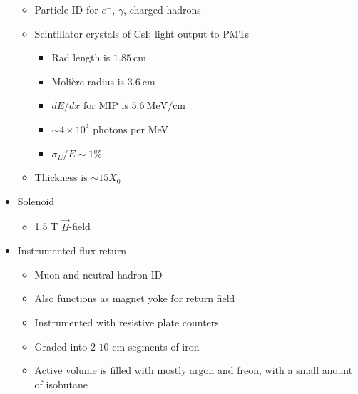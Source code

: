 \documentclass[11pt]{article}
\newcommand{\B}{\ensuremath{\vec{B}}}
\newcommand{\cm}{\text{cm}}
\newcommand{\mev}{\text{MeV}}
\newcommand{\el}{\ensuremath{e^{-}}\xspace}
\begin{document}
\begin{itemize}
  \begin{itemize}
    \item Particle ID for \el, $\gamma$, charged hadrons
    \item Scintillator crystals of CsI; light output to PMTs
    \begin{itemize}
      \item Rad length is $1.85~\cm$
      \item Moli\`ere radius is $3.6~\cm$
      \item $dE/dx$ for MIP is $5.6~\mev/\cm$
      \item $\sim 4 \times 10^4$ photons per MeV
      \item $\sigma_E/E \sim 1\%$
    \end{itemize}
    \item Thickness is $\sim 15 X_0$
  \end{itemize}
  \item Solenoid
  \begin{itemize}
    \item 1.5 T \B-field
  \end{itemize}
  \item Instrumented flux return
  \begin{itemize}
    \item Muon and neutral hadron ID
    \item Also functions as magnet yoke for return field
    \item Instrumented with resistive plate counters
    \item Graded into $2$-$10$ cm segments of iron
    \item Active volume is filled with mostly argon and freon, with a small anount of isobutane
  \end{itemize}
\end{itemize}
\end{document}
